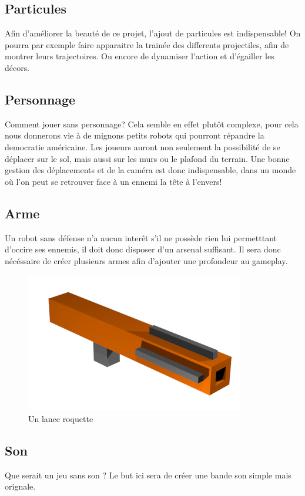 ﻿\documentclass{article}
\begin{document}
\subsection{Particules}
Afin d'améliorer la beauté de ce projet, l'ajout de particules est indispensable!
On pourra par exemple faire apparaitre la trainée des differents projectiles, afin de montrer leurs
trajectoires. Ou encore de dynamiser l'action et d'égailler les décors.

\subsection{Personnage}
Comment jouer sans personnage? Cela semble en effet plutôt complexe, pour cela nous donnerons 
vie à de mignons petits robots qui pourront répandre la democratie américaine.
Les joueurs auront non seulement la possibilité de se déplacer sur le sol, mais aussi
sur les murs ou le plafond du terrain. Une bonne gestion des déplacements et de la
caméra est donc indispensable, dans un monde où l'on peut se retrouver face
à un ennemi la tête à l'envers!

\newpage\subsection{Arme}
Un robot sans défense n'a aucun interêt s'il ne possède rien lui permetttant d'occire ses ennemis, 
il doit donc disposer d'un arsenal suffisant. Il sera donc nécéssaire de créer plusieurs armes
afin d'ajouter une profondeur au gameplay.

\begin{figure}[h]
\centerline{\includegraphics[scale=0.5]{rocket_launcher.png}}
\caption{Un lance roquette}
\end{figure}


\subsection{Son}
Que serait un jeu sans son ?
Le but ici sera de créer une bande son simple mais orignale.
\end{document}
